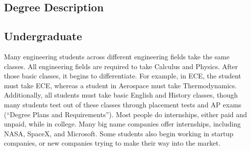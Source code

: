 \begin{multicols}{2}

\section{Degree Description}
    \subsection{Undergraduate}
        Many engineering students across different engineering fields take the same classes. All engineering fields are required to take Calculus and Physics. After those basic classes, it begins to differentiate. For example, in ECE, the student must take ECE, whereas a student in Aerospace must take Thermodynamics. Additionally, all students must take basic English and History classes, though many students test out of these classes through placement tests and AP exams (“Degree Plans and Requirements”). 
        Most people do internships, either paid and unpaid, while in college. Many big name companies offer internships, including NASA, SpaceX, and Microsoft. Some students also begin working in startup companies, or new companies trying to make their way into the market. 

\end{multicols}
